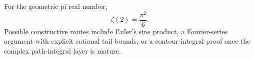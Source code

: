 \begin{conjecture}\label{conj:basel}
For the geometric pi real number,
\[
  \zeta(2)\Equiv \frac{\pi^2}{6}.
\]
Possible constructive routes include Euler's sine product, a Fourier-series
argument with explicit rational tail bounds, or a contour-integral proof once
the complex path-integral layer is mature.
\end{conjecture}

